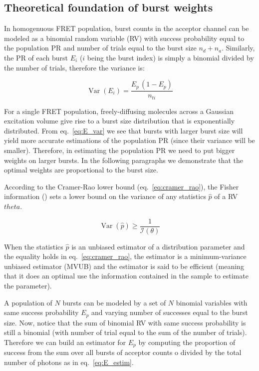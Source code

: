 \subsection{Theoretical foundation of burst weights}
\label{sec:burstweights_theory}
In homogenuous FRET population, burst counts in the acceptor channel can be
modeled as a binomial random variable (RV) with success probability equal to the
population PR and number of trials equal to the burst size $n_d + n_a$.
Similarly, the PR of each burst $E_i$ ($i$ being the burst index) is 
simply a binomial divided by the number of trials, therefore the variance is:

\begin{equation}
\label{eq:E_var}
\operatorname{Var} (E_i) = \frac{E_p\,(1 - E_p)}{n_{ti}}
\end{equation}

For a single FRET population, freely-diffusing molecules across 
a Gaussian excitation volume give rise to 
a burst size distribution that is exponentially distributed.
From eq.~\ref{eq:E_var} we see that bursts with larger burst size
will yield more accurate estimations of the population PR
(since their variance will be smaller). Therefore, in estimating the 
population PR we need to put bigger weights on larger bursts.
In the following paragraphs we demonstrate that the optimal weights
are proportional to the burst size.

According to the Cramer-Rao lower bound (eq.~\ref{eq:cramer_rao}), the 
Fisher information (\theta) sets a lower bound on the
variance of any statistics $\hat{p}$ of a RV $theta$.

\begin{equation}
\label{eq:cramer_rao}
\operatorname{Var}\left(\hat{p}\right) \ge \frac{1}{\mathcal{I}(\theta)}
\end{equation}

When the statistics $\hat{p}$ is an unbiased estimator of a distribution 
parameter and the equality holds in eq.~\ref{eq:cramer_rao},
the estimator is a minimum-variance unbiased estimator (MVUB)
and the estimator is said to be efficient (meaning that it does an
optimal use the information contained in the sample to estimate the
parameter).

A population of $N$ bursts can be modeled by a set of $N$ binomial
variables with same success probability $E_p$ and varying number of successes
equal to the burst size. Now, notice that the sum of binomial RV with same 
success probability is still a binomial (with number of trial equal to 
the sum of the number of trials).
Therefore we can build an estimator for $E_p$ by computing the proportion of
success from the sum over all bursts of acceptor counts o divided by the total
number of photons as in eq.~\ref{eq:E_estim}.

